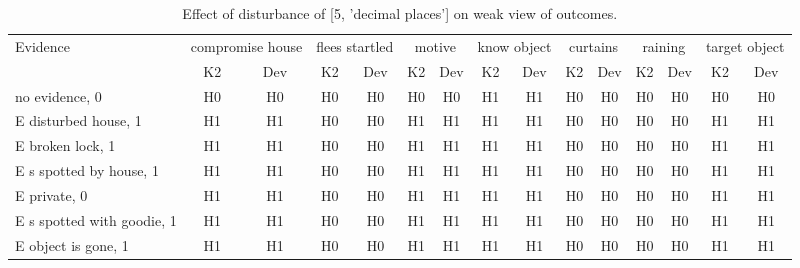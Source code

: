 \begin{table}\begin{tabular}{l|cc|cc|cc|cc|cc|cc|cc}\toprule\multirow{2}{*}{Evidence} & \multicolumn{2}{c}{compromise house}& \multicolumn{2}{c}{flees startled}& \multicolumn{2}{c}{motive}& \multicolumn{2}{c}{know object}& \multicolumn{2}{c}{curtains}& \multicolumn{2}{c}{raining}& \multicolumn{2}{c}{target object}\\& {K2} & {Dev}& {K2} & {Dev}& {K2} & {Dev}& {K2} & {Dev}& {K2} & {Dev}& {K2} & {Dev}& {K2} & {Dev}\\\midrule
no evidence, 0 & H0&H0&H0&H0&H0&H0&H1&H1&H0&H0&H0&H0&H0&H0\\E disturbed house, 1 & H1&H1&H0&H0&H1&H1&H1&H1&H0&H0&H0&H0&H1&H1\\E broken lock, 1 & H1&H1&H0&H0&H1&H1&H1&H1&H0&H0&H0&H0&H1&H1\\E s spotted by house, 1 & H1&H1&H0&H0&H1&H1&H1&H1&H0&H0&H0&H0&H1&H1\\E private, 0 & H1&H1&H0&H0&H1&H1&H1&H1&H0&H0&H0&H0&H1&H1\\E s spotted with goodie, 1 & H1&H1&H0&H0&H1&H1&H1&H1&H0&H0&H0&H0&H1&H1\\E object is gone, 1 & H1&H1&H0&H0&H1&H1&H1&H1&H0&H0&H0&H0&H1&H1\\\bottomrule\end{tabular}\caption{Effect of disturbance of [5, 'decimal places'] on weak view of outcomes.}\end{table}